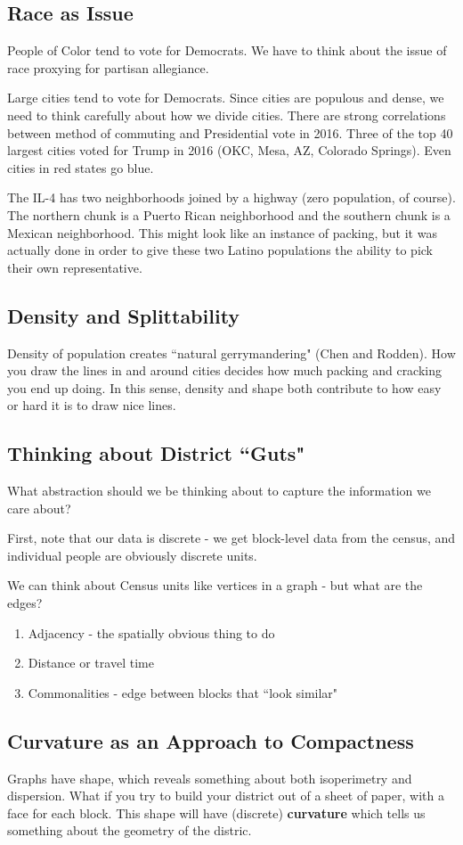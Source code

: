 \subsection*{Race as Issue}

People of Color tend to vote for Democrats. We have to think about the issue of race proxying for partisan allegiance.

 Large cities tend to vote for Democrats.  Since cities are populous and dense, we need to think carefully about how we divide cities.  There are strong correlations between method of commuting and Presidential vote in 2016.  Three of the top 40 largest cities voted for Trump in 2016 (OKC, Mesa, AZ, Colorado Springs).  Even cities in red states go blue.
 
 The IL-4 has two neighborhoods joined by a highway (zero population, of course).  The northern chunk is a Puerto Rican neighborhood and the southern chunk is a Mexican neighborhood.  This might look like an instance of packing, but it was actually done in order to give these two Latino populations the ability to pick their own representative.
 
\subsection*{Density and Splittability}

Density of population creates ``natural gerrymandering" (Chen and Rodden).  How you draw the lines in and around cities decides how much packing and cracking you end up doing.  In this sense, density and shape both contribute to how easy or hard it is to draw nice lines.


\subsection*{Thinking about District ``Guts"}

What abstraction should we be thinking about to capture the information we care about?

First, note that our data is discrete - we get block-level data from the census, and individual people are obviously discrete units.

We can think about Census units like vertices in a graph - but what are the edges?

\begin{enumerate}
	\item[] Adjacency - the spatially obvious thing to do
	\item[] Distance or travel time
	\item[] Commonalities - edge between blocks that ``look similar"
\end{enumerate}

\subsection*{Curvature as an Approach to Compactness}

Graphs have shape, which reveals something about both isoperimetry and dispersion.  What if you try to build your district out of a sheet of paper, with a face for each block.  This shape will have (discrete) \textbf{curvature} which tells us something about the geometry of the distric.